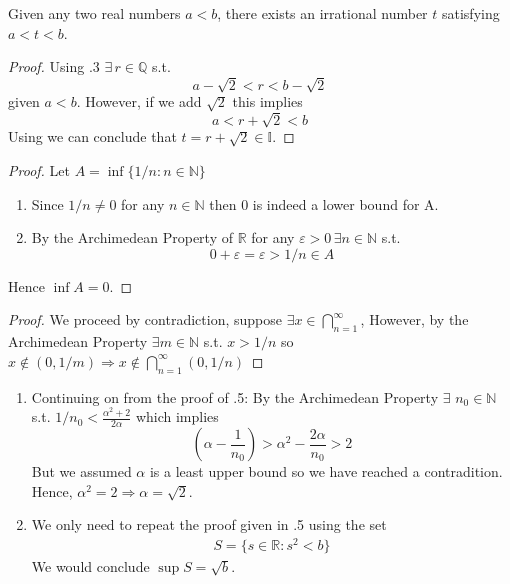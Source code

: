 \begin{corollary}
    Given any two real numbers $a<b$, there exists an irrational
    number $t$ satisfying $a<t<b$.
\end{corollary}
\begin{proof}
    Using .3 $\exists \, r \in \mathbb{Q}$ s.t. 
    \begin{equation*}
        a - \sqrt 2 < r < b - \sqrt 2 
    \end{equation*}
    given $a < b$. However, if we add $\sqrt 2$ this implies 
    \begin{equation*}
        a < r + \sqrt 2 < b
    \end{equation*}
    Using  we can conclude that $t = r + \sqrt 2 \in \mathbb{I}$.
\end{proof}

\begin{proof}
    Let $A = \inf \{ 1/n: n \in \mathbb{N} \}$
    \begin{enumerate}[label=(\alph*)]
        \item 
        Since $1/n \neq 0$ for any $n \in  \mathbb{N}$ then 0
        is indeed a lower bound for A.

        \item 
        By the Archimedean Property of $\mathbb{R}$ for any
        $\varepsilon > 0 \, \exists n \in \mathbb{N}$ s.t.
        \begin{equation*}
            0 + \varepsilon = \varepsilon > 1/n \in A
        \end{equation*}
    \end{enumerate}
    Hence $\inf A = 0$.
\end{proof}

\begin{proof}
    We proceed by contradiction, suppose $\exists x \in \bigcap_{n=1}^{\infty}$,
    However, by the Archimedean Property $ \exists m \in \mathbb{N}$ s.t.
    $x > 1/n$ so $x \notin (0,1/m) \Rightarrow x  \notin \bigcap_{n=1}^{\infty} (0,1/n)$
\end{proof}

\begin{enumerate}[label=(\alph*)]
    \item 
    Continuing on from the proof of .5:
    By the Archimedean Property $\exists$ $n_0 \in \mathbb{N}$ s.t. 
    $1 / n_0 < \frac{\alpha^2+2}{2\alpha} $ which implies
    \begin{equation*}
        \left( \alpha - \frac{1}{n_0} \right) > \alpha^2 - \frac{2\alpha}{n_0} > 2
    \end{equation*}
    But we assumed $\alpha$ is a least upper bound so we have reached a 
    contradition. Hence, $\alpha^2 = 2 \Rightarrow \alpha=\sqrt 2$.

    \item
    We only need to repeat the proof given in .5 using the set
    \begin{align*}
        S = \{ s\in \mathbb{R}: s^2 < b \}
    \end{align*}
    We would conclude $\sup S = \sqrt b$.
\end{enumerate}

